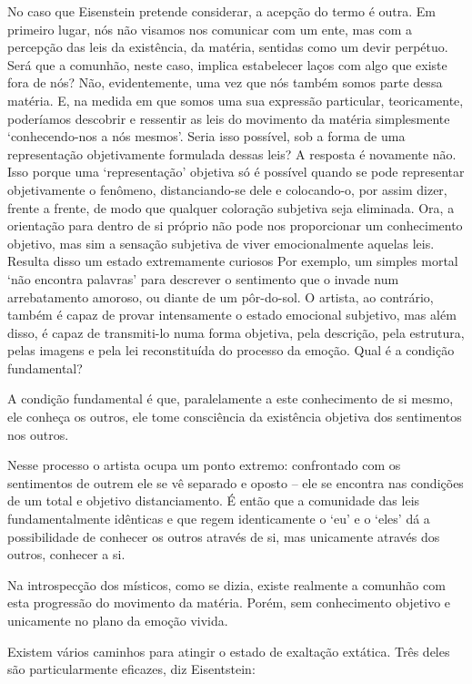 No caso que Eisenstein pretende considerar, a acepção do termo é outra.
Em primeiro lugar, nós não visamos nos comunicar com um ente, mas com a
percepção das leis da existência, da matéria, sentidas como um devir
perpétuo. Será que a comunhão, neste caso, implica estabelecer laços com
algo que existe fora de nós? Não, evidentemente, uma vez que nós também
somos parte dessa matéria. E, na medida em que somos uma sua expressão
particular, teoricamente, poderíamos descobrir e ressentir as leis do
movimento da matéria simplesmente `conhecendo-nos a nós mesmos'. Seria
isso possível, sob a forma de uma representação objetivamente formulada
dessas leis? A resposta é novamente não. Isso porque uma `representação'
objetiva só é possível quando se pode representar objetivamente o
fenômeno, distanciando-se dele e colocando-o, por assim dizer, frente a
frente, de modo que qualquer coloração subjetiva seja eliminada. Ora, a
orientação para dentro de si próprio não pode nos proporcionar um
conhecimento objetivo, mas sim a sensação subjetiva de viver
emocionalmente aquelas leis. Resulta disso um estado extremamente
curiosos Por exemplo, um simples mortal `não encontra palavras' para
descrever o sentimento que o invade num arrebatamento amoroso, ou diante
de um pôr-do-sol. O artista, ao contrário, também é capaz de provar
intensamente o estado emocional subjetivo, mas além disso, é capaz de
transmiti-lo numa forma objetiva, pela descrição, pela estrutura, pelas
imagens e pela lei reconstituída do processo da emoção. Qual é a
condição fundamental?

A condição fundamental é que, paralelamente a este conhecimento de si
mesmo, ele conheça os outros, ele tome consciência da existência
objetiva dos sentimentos nos outros.

Nesse processo o artista ocupa um ponto extremo: confrontado com os
sentimentos de outrem ele se vê separado e oposto -- ele se encontra nas
condições de um total e objetivo distanciamento. É então que a
comunidade das leis fundamentalmente idênticas e que regem identicamente
o `eu' e o `eles' dá a possibilidade de conhecer os outros através de
si, mas unicamente através dos outros, conhecer a si.

Na introspecção dos místicos, como se dizia, existe realmente a comunhão
com esta progressão do movimento da matéria. Porém, sem conhecimento
objetivo e unicamente no plano da emoção vivida.

Existem vários caminhos para atingir o estado de exaltação extática.
Três deles são particularmente eficazes, diz Eisentstein:

